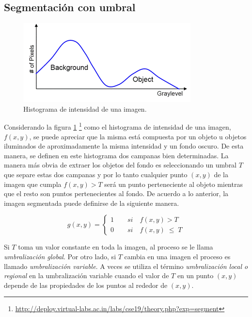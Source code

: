\subsection{Segmentación con umbral}

\begin{figure}[hbt]
\begin{center}
\includegraphics[scale=0.7]{img/otsu2.png}
\end{center}
\vspace{-0.5cm}
\caption{Histograma de intensidad de una imagen.} 
\label{otsuFruta}
\end{figure}


Considerando la figura \ref{otsuFruta} \footnote{\textcolor{blue}{\underline{\url{ http://deploy.virtual-labs.ac.in/labs/cse19/theory.php?exp=segment}}}}  como el histograma de intensidad de una imagen, $f(x,y)$, se puede apreciar que la misma está compuesta por un objeto u objetos iluminados de aproximadamente la misma intensidad y un fondo oscuro. De esta manera, se definen en este histograma dos campanas bien determinadas. La manera más obvia de extraer los objetos del fondo es seleccionando un umbral $T$ que separe estas dos campanas y por lo tanto cualquier punto $(x,y)$ de la imagen que cumpla $f(x,y) > T$ será un punto perteneciente al objeto mientras que el resto son puntos pertenecientes al fondo. De acuerdo a lo anterior, la imagen segmentada puede definirse de la siguiente manera.

\begin{equation}
g(x,y) = \left\{
\begin{array}{l}
\displaystyle 1{\qquad}si{\quad}f(x,y) > T\\
\displaystyle 0{\qquad}si{\quad}f(x,y)\;{\leq}\;T
\end{array} 
\right.
\label{eq:xdef}
\end{equation}

Si $T$ toma un valor constante en toda la imagen, al proceso se le llama \textit{umbralización global}. Por otro lado, si $T$ cambia en una imagen el proceso es llamado \textit{umbralización variable}. A veces se utiliza el término \textit{umbralización local o regional} en la umbralización variable cuando el valor de $T$ en un punto $(x,y)$ depende de las propiedades de los puntos al rededor de $(x,y)$.


